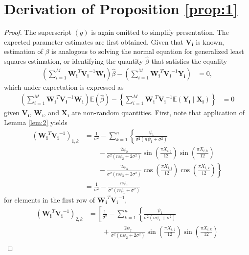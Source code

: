 \section{Derivation of Proposition \ref{prop:1}} \label{app:B}
\begin{proof}
The superscript $(g)$ is again omitted to simplify presentation. The expected parameter estimates are first obtained. Given that $\boldsymbol{V_i}$ is known, estimation of $\beta$ is analogous to solving the normal equation for generalized least squares estimation, or identifying the quantity $\hat{\beta}$ that satisfies the equality
\begin{align*}
    \left(\sum_{i=1}^M\boldsymbol{W_i}^T\boldsymbol{V_i}^{-1}\boldsymbol{W_i}\right)\hat{\beta} - \left(\sum_{i=1}^M\boldsymbol{W_i}^T\boldsymbol{V_i}^{-1}\boldsymbol{Y_i}\right) &= 0,
\end{align*}
which under expectation is expressed as
\begin{align*}
    \left(\sum_{i=1}^M\boldsymbol{W_i}^T\boldsymbol{V_i}^{-1}\boldsymbol{W_i}\right)\mathbb{E}(\hat{\beta}) - \left\{\sum_{i=1}^M\boldsymbol{W_i}^T\boldsymbol{V_i}^{-1}\mathbb{E}(\boldsymbol{Y_i} \mid \boldsymbol{X_i})\right\} &= 0
\end{align*}
given $\boldsymbol{V_i}$, $\boldsymbol{W_i}$, and $\boldsymbol{X_i}$ are non-random quantities. First, note that application of Lemma \ref{lem:2} yields
\begin{align*}
    \left(\boldsymbol{W_i}^T\boldsymbol{V_i}^{-1}\right)_{1,k} &= \frac{1}{\sigma^2} - \sum_{k=1}^n\left\{\frac{\psi_1}{\sigma^2(n\psi_1+\sigma^2)} \right. \\
    & \left. \quad \quad - \frac{2\psi_2}{\sigma^2(n\psi_2+2\sigma^2)}\sin\left(\frac{\pi X_{i,j}}{12}\right)\sin\left(\frac{\pi X_{i,k}}{12}\right) \right. \\
    &\left. \quad \quad - \frac{2\psi_3}{\sigma^2(n\psi_3+2\sigma^2)}\cos\left(\frac{\pi X_{i,j}}{12}\right)\cos\left(\frac{\pi X_{i,k}}{12}\right)\right\} \\
    &= \frac{1}{\sigma^2} - \frac{n\psi_1}{\sigma^2(n\psi_1+\sigma^2)}
\end{align*}
for elements in the first row of $\boldsymbol{W_i}^T\boldsymbol{V_i}^{-1}$,
\begin{align*}
    \left(\boldsymbol{W_i}^T\boldsymbol{V_i}^{-1}\right)_{2,k} &= \left[\frac{1}{\sigma^2} - \sum_{k=1}^n \left\{\frac{\psi_1}{\sigma^2(n\psi_1+\sigma^2)} \right.  \right. \\
    & \left. \left. \quad \quad + \frac{2\psi_2}{\sigma^2(n\psi_2+2\sigma^2)}\sin\left(\frac{\pi X_{i,j}}{12}\right)\sin\left(\frac{\pi X_{i,k}}{12}\right) \right. \right. \\

\end{align*}
\end{proof}
